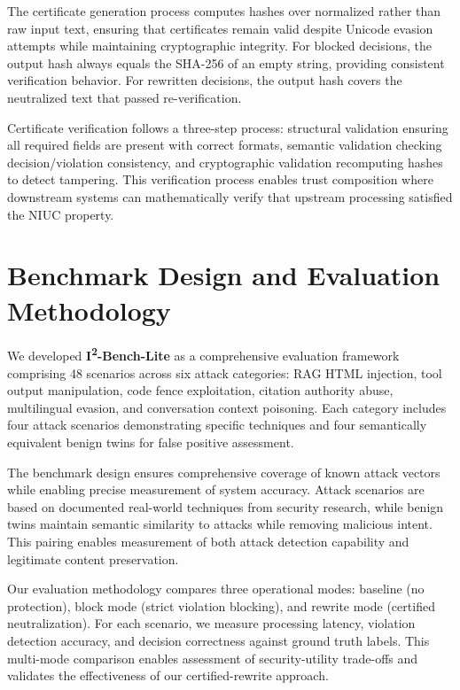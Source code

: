 The certificate generation process computes hashes over normalized rather than raw input text, ensuring that certificates remain valid despite Unicode evasion attempts while maintaining cryptographic integrity. For blocked decisions, the output hash always equals the SHA-256 of an empty string, providing consistent verification behavior. For rewritten decisions, the output hash covers the neutralized text that passed re-verification.

Certificate verification follows a three-step process: structural validation ensuring all required fields are present with correct formats, semantic validation checking decision/violation consistency, and cryptographic validation recomputing hashes to detect tampering. This verification process enables trust composition where downstream systems can mathematically verify that upstream processing satisfied the NIUC property.

\section{Benchmark Design and Evaluation Methodology}

We developed \textbf{I\textsuperscript{2}-Bench-Lite} as a comprehensive evaluation framework comprising 48 scenarios across six attack categories: RAG HTML injection, tool output manipulation, code fence exploitation, citation authority abuse, multilingual evasion, and conversation context poisoning. Each category includes four attack scenarios demonstrating specific techniques and four semantically equivalent benign twins for false positive assessment.

The benchmark design ensures comprehensive coverage of known attack vectors while enabling precise measurement of system accuracy. Attack scenarios are based on documented real-world techniques from security research, while benign twins maintain semantic similarity to attacks while removing malicious intent. This pairing enables measurement of both attack detection capability and legitimate content preservation.

Our evaluation methodology compares three operational modes: baseline (no protection), block mode (strict violation blocking), and rewrite mode (certified neutralization). For each scenario, we measure processing latency, violation detection accuracy, and decision correctness against ground truth labels. This multi-mode comparison enables assessment of security-utility trade-offs and validates the effectiveness of our certified-rewrite approach.

